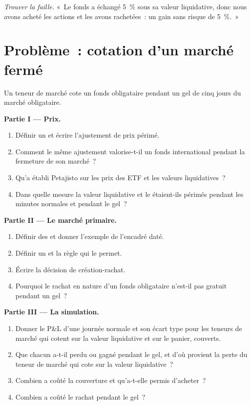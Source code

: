 \begin{exercise}[$\star\star\star$]\label{exo:hf:etf-market-making:8}
\emph{Trouver la faille.} «~Le fonds a échangé 5~\% sous sa valeur liquidative, donc nous avons acheté les actions et les avons rachetées~: un gain sans risque de 5~\%.~»
\end{exercise}

\section{Problème~: cotation d'un marché fermé}

\begin{problem}\label{pb:hf:etf-market-making:1}
Un teneur de marché cote un fonds obligataire pendant un gel de cinq jours du marché obligataire.

\medskip\noindent\textbf{Partie I --- Prix.}
\begin{enumerate}
\item Définir un  et écrire l'ajustement de prix périmé.
\item Comment le même ajustement valorise-t-il un fonds international pendant la fermeture de son marché~?
\item Qu'a établi Petajisto sur les prix des ETF et les valeurs liquidatives~?
\item Dans quelle mesure la valeur liquidative et le  étaient-ils périmés pendant les minutes normales et pendant le gel~?
\end{enumerate}

\medskip\noindent\textbf{Partie II --- Le marché primaire.}
\begin{enumerate}[resume]
\item Définir des  et donner l'exemple de l'encadré daté.
\item Définir un  et la règle qui le permet.
\item Écrire la décision de création-rachat.
\item Pourquoi le rachat en nature d'un fonds obligataire n'est-il pas gratuit pendant un gel~?
\end{enumerate}

\medskip\noindent\textbf{Partie III --- La simulation.}
\begin{enumerate}[resume]
\item Donner le P\&L d'une journée normale et son écart type pour les teneurs de marché qui cotent sur la valeur liquidative et sur le panier, couverts.
\item Que chacun a-t-il perdu ou gagné pendant le gel, et d'où provient la perte du teneur de marché qui cote sur la valeur liquidative~?
\item Combien a coûté la couverture et qu'a-t-elle permis d'acheter~?
\item Combien a coûté le rachat pendant le gel~?
\end{enumerate}


\end{problem}
